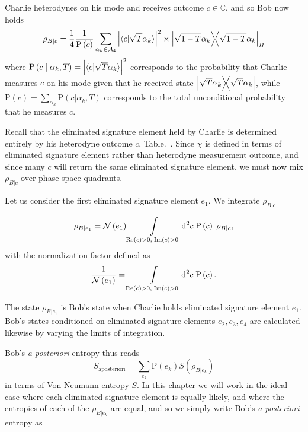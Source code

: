 \noindent Charlie heterodynes on his mode and receives outcome $c \in \mathbb{C}$, and so Bob now holds
\begin{equation}
\rho_{B | c} = \frac{1}{4}\frac{1}{\text{P}\left(c\right)}\sum_{\alpha_k \in \mathcal{A}_4} \left| \langle c | \sqrt{T}\alpha_k\rangle \right|^2 \times \dyad{\sqrt{1-T}\alpha_k}_B
\end{equation}
where $\text{P}\left(c \; \middle| \; \alpha_k, T\right) = \left| \langle c | \sqrt{T}\alpha_k\rangle \right|^2$ corresponds to the probability that Charlie measures $c$ on his mode given that he received state $\dyad{\sqrt{T}\alpha_k}$, while $\text{P}\left(c\right) = \sum_{\alpha_k} \text{P}\left(c | \alpha_k, T\right)$ corresponds to the total unconditional probability that he measures $c$.

Recall that the eliminated signature element held by Charlie is determined entirely by his heterodyne outcome $c$, Table.~. Since $\chi$ is defined in terms of eliminated signature element rather than heterodyne measurement outcome, and since many $c$ will return the same eliminated signature element, we must now mix $\rho_{B | c}$ over phase-space quadrants.


Let us consider the first eliminated signature element $e_1$. We integrate $\rho_{B | c}$

\begin{equation}\label{eqn:qds_aposterioristate}
\rho_{B | e_1} = \mathcal{N}\left(e_1\right) \int\limits_{\text{Re}\left(c\right) > 0, \; \text{Im}\left(c\right)>0} \mathop{}\!\mathrm{d^2} c \; \text{P}\left(c\right) \; \rho_{B | c},
\end{equation}
with the normalization factor defined as 
\begin{equation}
\frac{1}{\mathcal{N}\left(e_1\right)} = \int\limits_{\text{Re}\left(c\right) > 0, \; \text{Im}\left(c\right)>0} \mathop{}\!\mathrm{d^2} c \; \text{P}\left(c\right).
\end{equation}

\noindent The state $\rho_{B|e_1}$ is Bob's state when Charlie holds eliminated signature element $e_1$. Bob's states conditioned on eliminated signature elements $e_2, e_3, e_4$ are calculated likewise by varying the limits of integration.

Bob's \emph{a posteriori} entropy thus reads
\begin{equation}
S_{\text{aposteriori}} = \sum_{e_k} \text{P}\left(e_k\right) S\left(\rho_{B | e_k}\right)
\end{equation}
in terms of Von Neumann entropy $S$. In this chapter we will work in the ideal case where each eliminated signature element is equally likely, and where the entropies of each of the $\rho_{B | e_k}$ are equal, and so we simply write Bob's \emph{a posteriori} entropy as

